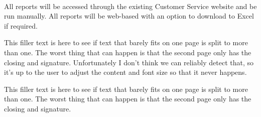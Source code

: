 \documentclass[10pt, a4paper, parskip=half,
               enlargefirstpage ]{scrlttr2}
\begin{document}
\begin{letter}{%
\tystrrecipient \\
\tystrrecipientaddress
}
All reports will be accessed through the existing Customer Service website and be run manually. All reports will be web-based with an option to download to Excel if required.

This filler text is here to see if text that barely fits on one page is split to more than one. The worst thing that can happen is that the second page only has the closing and signature. Unfortunately I don’t think we can reliably detect that, so it’s up to the user to adjust the content and font size so that it never happens.

This filler text is here to see if text that barely fits on one page is split to more than one. The worst thing that can happen is that the second page only has the closing and signature. 


\closing{\tystrclosing}
\end{letter}
\end{document}
